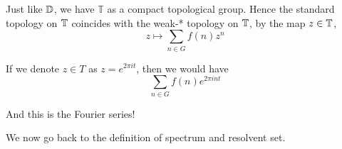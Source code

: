 Just like $\mathbb{D}$, we have $\mathbb{T}$ as a compact topological group. Hence the standard topology on $\mathbb{T}$ coincides with the weak-* topology on $\mathbb{T}$, by the map $z\in\mathbb{T}$,
\begin{equation*}
    z\mapsto \sum_{n\in G}f(n)z^n
\end{equation*}

If we denote $z\in T$ as $z=e^{2\pi it}$,
then we would have
\begin{equation*}
    \sum_{n\in G}f(n)e^{2\pi int}
\end{equation*}

And this is the Fourier series!


We now go back to the definition of spectrum and resolvent set.


